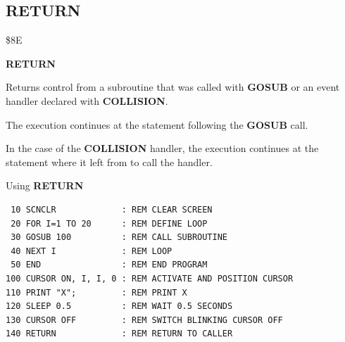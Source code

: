 \subsection{RETURN}
\begin{description}[leftmargin=2cm,style=nextline]
\item [Token:]    \$8E

\item [Format:]   {\bf RETURN}

\item [Usage:]    Returns control from a subroutine that was called with {\bf GOSUB} or an event handler declared with {\bf COLLISION}.

                  The execution continues at the statement following the {\bf GOSUB} call.

                  In the case of the {\bf COLLISION} handler, the execution continues at the statement where it left from to call the handler.

\item [Example:]  Using {\bf RETURN}

\begin{tcolorbox}[colback=black,coltext=white]
\verbatimfont{\codefont}
\begin{verbatim}
 10 SCNCLR             : REM CLEAR SCREEN
 20 FOR I=1 TO 20      : REM DEFINE LOOP
 30 GOSUB 100          : REM CALL SUBROUTINE
 40 NEXT I             : REM LOOP
 50 END                : REM END PROGRAM
100 CURSOR ON, I, I, 0 : REM ACTIVATE AND POSITION CURSOR
110 PRINT "X";         : REM PRINT X
120 SLEEP 0.5          : REM WAIT 0.5 SECONDS
130 CURSOR OFF         : REM SWITCH BLINKING CURSOR OFF
140 RETURN             : REM RETURN TO CALLER
\end{verbatim}
\end{tcolorbox}
\end{description}


\newpage
